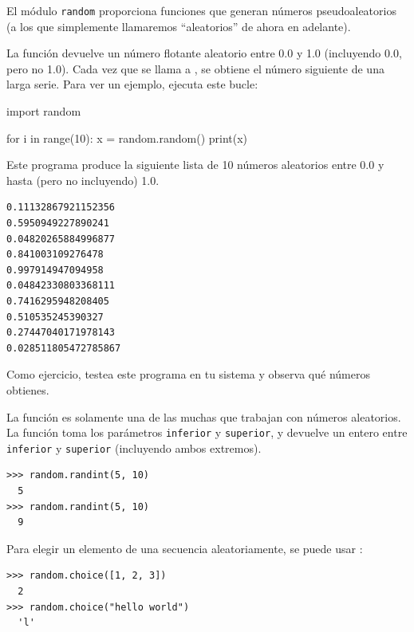 El módulo \texttt{random} proporciona funciones que generan números
pseudoaleatorios (a los que simplemente llamaremos ``aleatorios'' de
ahora en adelante).

 

La función  devuelve un número flotante aleatorio entre
0.0 y 1.0 (incluyendo 0.0, pero no 1.0). Cada vez que se llama a
, se obtiene el número siguiente de una larga serie. Para
ver un ejemplo, ejecuta este bucle:

\begin{python}[frame=single]
import random

for i in range(10):
    x = random.random()
    print(x)
\end{python}

Este programa produce la siguiente lista de 10 números aleatorios entre
0.0 y hasta (pero no incluyendo) 1.0.

\begin{Verbatim}[frame=single]
0.11132867921152356
0.5950949227890241
0.04820265884996877
0.841003109276478
0.997914947094958
0.04842330803368111
0.7416295948208405
0.510535245390327
0.27447040171978143
0.028511805472785867
\end{Verbatim}

Como ejercicio, testea este programa en tu sistema y observa qué números obtienes.

La función  es solamente una de las muchas que trabajan
con números aleatorios. La función  toma los parámetros
\texttt{inferior} y \texttt{superior}, y devuelve un entero entre
\texttt{inferior} y \texttt{superior} (incluyendo ambos extremos).

 

\begin{Verbatim}[frame=single]
>>> random.randint(5, 10)
  5
>>> random.randint(5, 10)
  9
\end{Verbatim}

Para elegir un elemento de una secuencia aleatoriamente, se puede usar
:

 

\begin{Verbatim}[frame=single]
>>> random.choice([1, 2, 3])
  2
>>> random.choice("hello world")
  'l'
\end{Verbatim}

